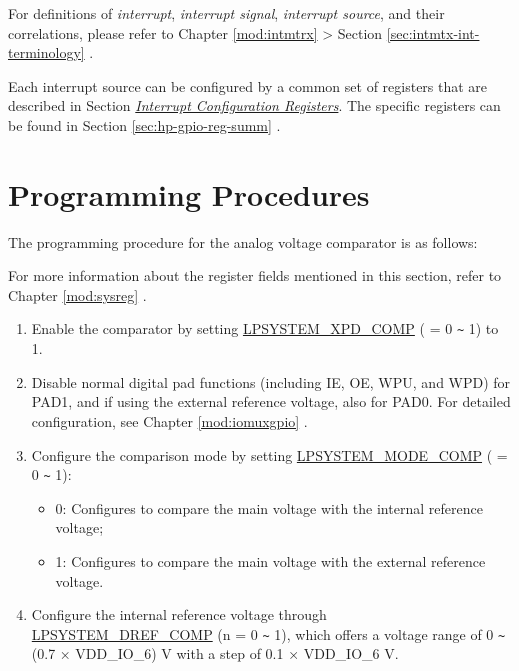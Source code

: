\documentclass[main\_\_EN.tex]{subfiles}
\begin{document}
\begin{tiplisting}
For definitions of \textit{interrupt}, \textit{interrupt signal}, \textit{interrupt source}, and their correlations, please refer to Chapter \ref{mod:intmtrx} \textit{} > Section \ref{sec:intmtx-int-terminology} \textit{}.
\end{tiplisting}

Each interrupt source can be configured by a common set of registers that are described in Section \hyperref[interrupt-config-registers]{\textit{Interrupt Configuration Registers}}. The specific registers can be found in Section \ref{sec:hp-gpio-reg-summ} \textit{}.



\section{Programming Procedures}
\label{sec:anacom-prog-procedures}

The programming procedure for the analog voltage comparator is as follows:

\begin{tiplisting}
For more information about the register fields mentioned in this section, refer to Chapter \ref{mod:sysreg} .
\end{tiplisting}

\begin{enumerate}
    \item Enable the comparator by setting \hyperref[fielddesc:LPSYSTEMXPDCOMP0]{LPSYSTEM\_XPD\_COMP} ( = 0 \verb+~+ 1) to 1.
    \item Disable normal digital pad functions (including IE, OE, WPU, and WPD) for PAD1, and if using the external reference voltage, also for PAD0. For detailed configuration, see Chapter \ref{mod:iomuxgpio} .
    \item Configure the comparison mode by setting \hyperref[fielddesc:LPSYSTEMMODECOMP0]{LPSYSTEM\_MODE\_COMP} ( = 0 \verb+~+ 1):
        \begin{itemize}
            \item 0: Configures to compare the main voltage with the internal reference voltage;
            \item 1: Configures to compare the main voltage with the external reference voltage.
        \end{itemize}
    \item Configure the internal reference voltage through \hyperref[fielddesc:LPSYSTEMDREFCOMP0]{LPSYSTEM\_DREF\_COMP} (n = 0 \verb+~+ 1), which offers a voltage range of 0 \verb+~+ (0.7 × VDD\_IO\_6) V with a step of 0.1 × VDD\_IO\_6 V.
\end{enumerate}
\end{document}

